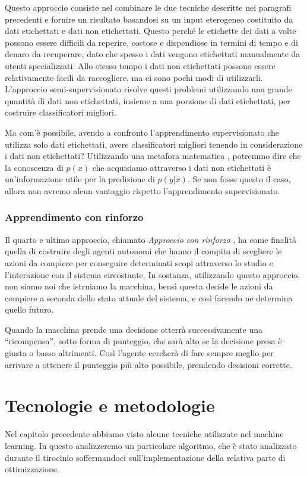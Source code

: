 \documentclass[a4paper,12pt]{report}
\begin{document}
Questo approccio consiste nel combinare le due tecniche descritte nei paragrafi precedenti e fornire un risultato basandosi su un input eterogeneo costituito da dati etichettati e dati non etichettati.
Questo perché le etichette dei dati a volte possono essere difficili da reperire, costose e dispendiose in termini di tempo e di denaro da recuperare, dato che spesso i dati vengono etichettati manualmente da utenti specializzati. Allo stesso tempo i dati non etichettati possono essere relativamente facili da raccogliere, ma ci sono pochi modi di utilizzarli. 
L'approccio semi-supervisionato risolve questi problemi utilizzando una grande quantità di dati non etichettati, insieme a una porzione di dati etichettati, per costruire classificatori migliori. 

Ma com'è possibile, avendo a confronto l'apprendimento supervisionato che utilizza solo dati etichettati, avere classificatori migliori tenendo in considerazione i dati non etichettati?
Utilizzando una metafora matematica \cite{supervisedlearning}, potremmo dire che la conoscenza di $p(x)$ che acquisiamo attraverso i dati non etichettati è un'informazione utile per la predizione di $p(y|x)$. Se non fosse questo il caso, allora non avremo alcun vantaggio rispetto l'apprendimento supervisionato.

\subsection*{Apprendimento con rinforzo}
Il quarto e ultimo approccio, chiamato \textit{Approccio con rinforzo} \cite{Reinforcement_learning}, ha come finalità quella di costruire degli agenti autonomi che hanno il compito di scegliere le azioni da compiere per conseguire determinati scopi attraverso lo studio e l'interazione con il sistema circostante.
In sostanza, utilizzando questo approccio, non siamo noi che istruiamo la macchina, bensì questa decide le azioni da compiere a seconda dello stato attuale del sistema, e così facendo ne determina quello futuro.

Quando la macchina prende una decisione otterrà successivamente una “ricompensa”, sotto forma di punteggio, che sarà alto se la decisione presa è giusta o basso altrimenti. Così l'agente cercherà di fare sempre meglio per arrivare a ottenere il punteggio più alto possibile, prendendo decisioni corrette.

\chapter{Tecnologie e metodologie}
\label{Capitolo 2}
Nel capitolo precedente abbiamo visto alcune tecniche utilizzate nel machine learning. In questo analizzeremo un particolare algoritmo, che è stato analizzato durante il tirocinio soffermandoci sull'implementazione della relativa parte di ottimizzazione.
\end{document}
